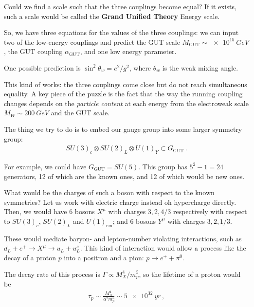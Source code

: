 \documentclass[main.tex]{subfiles}
\begin{document}
Could we find a scale such that the three couplings become equal?
If it exists, such a scale would be called the \textbf{Grand Unified Theory} Energy scale. 

So, we have three equations for the values of the three couplings: 
we can input two of the low-energy couplings and predict the GUT scale \(M _{\text{GUT}} \sim \SI{e15}{GeV}\), the GUT coupling \(\alpha _{\text{GUT}}\), and one low energy parameter.

One possible prediction is \(\sin^2\theta_{w} = e^2 / g^2\), where \(\theta_{w}\) is the weak mixing angle. 

This kind of works: the three couplings come close but do not reach simultaneous equality.
A key piece of the puzzle is the fact that the way the running coupling changes depends on the \emph{particle content} at each energy from the electroweak scale \(M_W \sim \SI{200}{GeV}\) and the GUT scale. 

The thing we try to do is to embed our gauge group into some larger symmetry group: 
%
\begin{align}
SU(3)_c \otimes SU(2)_L \otimes U(1)_Y \subset G _{\text{GUT}}
\,.
\end{align}

For example, we could have \(G _{\text{GUT}} = SU(5)\). This group has \(5^2 - 1 = 24\) generators, 12 of which are the known ones, and 12 of which would be new ones.

What would be the charges of such a boson with respect to the known symmetries? Let us work with electric charge instead oh hypercharge directly. Then, we would have 6 bosons \(X^{\mu }\) with charges \(3, 2, 4/3\) respectively with respect to \(SU(3)_c\), \(SU(2)_L\) and \(U(1) _{\text{em}}\); and 6 bosons \(Y^{\mu } \) with charges \(3, 2, 1/3\). 

These would mediate baryon- and lepton-number violating interactions, such as \(d_L + e^{+} \to X^{\mu } \to u_L + u^{c}_{L}\).
This kind of interaction would allow a process like the decay of a proton \(p\) into a positron and a pion: \(p \to e^{+} + \pi^{0}\). 

The decay rate of this process is  \(\Gamma \propto M_X^{4} / m_p^{5}\), so the lifetime of a proton would be 
%
\begin{align}
\tau_{p} \sim \frac{M_X^{4}}{\alpha^2 m_p^{5}} \sim \SI{5e32}{yr}
\,,
\end{align}
%
\end{document}
